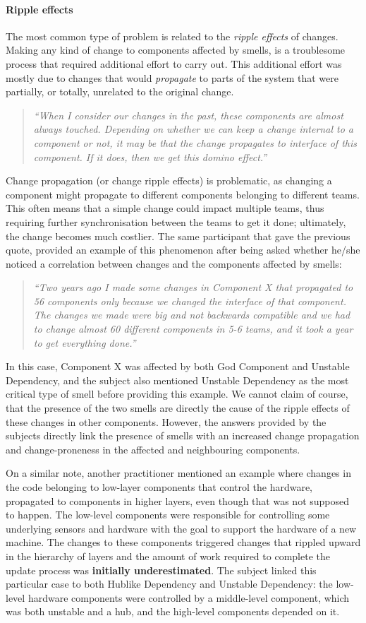 \paragraph{Ripple effects}
The most common type of problem is related to the \emph{ripple effects} of changes. Making any kind of change to components affected by smells, is a 
troublesome process that required additional effort to carry out.
This additional effort was mostly due to changes that would \emph{propagate} to parts of the system that were partially, or totally, unrelated to the original change.
\begin{quote}
    \emph{``When I consider our changes in the past, these components are almost always touched. Depending on whether we can keep a change internal to a component or not, it may be that the change propagates to interface of this component. If it does, then we get this domino effect.''}
\end{quote}
Change propagation (or change ripple effects) is problematic, as changing a component might propagate to different components belonging to different teams.
This often means that a simple change could impact multiple teams, thus requiring further synchronisation between the teams to get it done; ultimately, the change becomes much costlier.
The same participant that gave the previous quote, provided an example of this phenomenon after being asked whether he/she noticed a correlation between changes and the components affected by smells:
\begin{quote}
    \emph{``Two years ago I made some changes in Component X that propagated to 56 components only because we changed the interface of that component. The changes we made were big and not backwards compatible and we had to change almost 60 different components in 5-6 teams, and it took a year to get everything done.''}
\end{quote}
In this case, Component X was affected by both God Component and Unstable Dependency, and the subject also mentioned Unstable Dependency as the most critical type of smell before providing this example.
We cannot claim of course, that the presence of the two smells are directly the cause of the ripple effects of these changes in other components.
However, the answers provided by the subjects directly link the presence of smells with an increased change propagation and change-proneness in the affected and neighbouring components.

On a similar note, another practitioner mentioned an example where changes in the code belonging to low-layer components that control the hardware, propagated to components in higher layers, even though that was not supposed to happen.
The low-level components were responsible for controlling some underlying sensors and hardware with the goal to support the hardware of a new machine.
The changes to these components triggered changes that rippled upward in the hierarchy of layers and the amount of work required to complete the update process was \textbf{initially underestimated}. The subject linked this particular case to both Hublike Dependency and Unstable Dependency: the low-level hardware components were controlled by a middle-level component, which was both unstable and a hub, and the high-level components depended on it.

